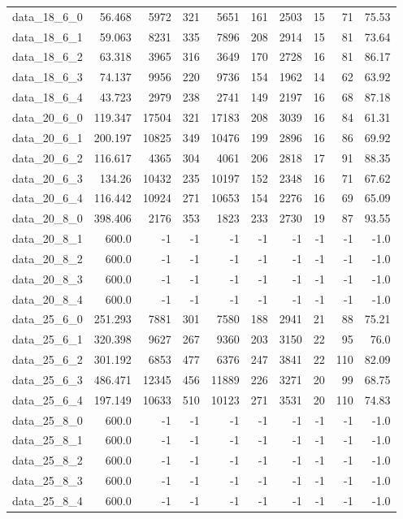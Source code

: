 \begin{tabular}{rrrrrrrrrr}
  data\_18\_6\_0 & 56.468 & 5972 & 321 & 5651 & 161 & 2503 & 15 & 71 & 75.53 \\
  data\_18\_6\_1 & 59.063 & 8231 & 335 & 7896 & 208 & 2914 & 15 & 81 & 73.64 \\
  data\_18\_6\_2 & 63.318 & 3965 & 316 & 3649 & 170 & 2728 & 16 & 81 & 86.17 \\
  data\_18\_6\_3 & 74.137 & 9956 & 220 & 9736 & 154 & 1962 & 14 & 62 & 63.92 \\
  data\_18\_6\_4 & 43.723 & 2979 & 238 & 2741 & 149 & 2197 & 16 & 68 & 87.18 \\
  data\_20\_6\_0 & 119.347 & 17504 & 321 & 17183 & 208 & 3039 & 16 & 84 & 61.31 \\
  data\_20\_6\_1 & 200.197 & 10825 & 349 & 10476 & 199 & 2896 & 16 & 86 & 69.92 \\
  data\_20\_6\_2 & 116.617 & 4365 & 304 & 4061 & 206 & 2818 & 17 & 91 & 88.35 \\
  data\_20\_6\_3 & 134.26 & 10432 & 235 & 10197 & 152 & 2348 & 16 & 71 & 67.62 \\
  data\_20\_6\_4 & 116.442 & 10924 & 271 & 10653 & 154 & 2276 & 16 & 69 & 65.09 \\
  data\_20\_8\_0 & 398.406 & 2176 & 353 & 1823 & 233 & 2730 & 19 & 87 & 93.55 \\
  data\_20\_8\_1 & 600.0 & -1 & -1 & -1 & -1 & -1 & -1 & -1 & -1.0 \\
  data\_20\_8\_2 & 600.0 & -1 & -1 & -1 & -1 & -1 & -1 & -1 & -1.0 \\
  data\_20\_8\_3 & 600.0 & -1 & -1 & -1 & -1 & -1 & -1 & -1 & -1.0 \\
  data\_20\_8\_4 & 600.0 & -1 & -1 & -1 & -1 & -1 & -1 & -1 & -1.0 \\
  data\_25\_6\_0 & 251.293 & 7881 & 301 & 7580 & 188 & 2941 & 21 & 88 & 75.21 \\
  data\_25\_6\_1 & 320.398 & 9627 & 267 & 9360 & 203 & 3150 & 22 & 95 & 76.0 \\
  data\_25\_6\_2 & 301.192 & 6853 & 477 & 6376 & 247 & 3841 & 22 & 110 & 82.09 \\
  data\_25\_6\_3 & 486.471 & 12345 & 456 & 11889 & 226 & 3271 & 20 & 99 & 68.75 \\
  data\_25\_6\_4 & 197.149 & 10633 & 510 & 10123 & 271 & 3531 & 20 & 110 & 74.83 \\
  data\_25\_8\_0 & 600.0 & -1 & -1 & -1 & -1 & -1 & -1 & -1 & -1.0 \\
  data\_25\_8\_1 & 600.0 & -1 & -1 & -1 & -1 & -1 & -1 & -1 & -1.0 \\
  data\_25\_8\_2 & 600.0 & -1 & -1 & -1 & -1 & -1 & -1 & -1 & -1.0 \\
  data\_25\_8\_3 & 600.0 & -1 & -1 & -1 & -1 & -1 & -1 & -1 & -1.0 \\
  data\_25\_8\_4 & 600.0 & -1 & -1 & -1 & -1 & -1 & -1 & -1 & -1.0 \\\hline
\end{tabular}
